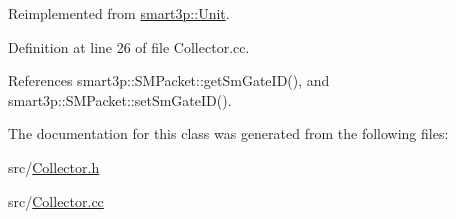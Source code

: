 Reimplemented from \hyperlink{classsmart3p_1_1Unit_a93f16f43dec69d23d8588f3b60c96d69}{smart3p\+::\+Unit}.



Definition at line 26 of file Collector.\+cc.



References smart3p\+::\+S\+M\+Packet\+::get\+Sm\+Gate\+I\+D(), and smart3p\+::\+S\+M\+Packet\+::set\+Sm\+Gate\+I\+D().



The documentation for this class was generated from the following files\+:\begin{DoxyCompactItemize}
\item 
src/\hyperlink{Collector_8h}{Collector.\+h}\item 
src/\hyperlink{Collector_8cc}{Collector.\+cc}\end{DoxyCompactItemize}
